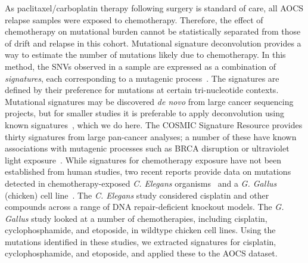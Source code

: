As paclitaxel/carboplatin therapy following surgery is standard of care, all AOCS relapse samples were exposed to chemotherapy. Therefore, the effect of chemotherapy on mutational burden cannot be statistically separated from those of drift and relapse in this cohort. Mutational signature deconvolution provides a way to estimate the number of mutations likely due to chemotherapy. In this method, the SNVs observed in a sample are expressed as a combination of \textit{signatures}, each corresponding to a mutagenic process~\cite{Alexandrov2013}. The signatures are defined by their preference for mutations at certain tri-nucleotide contexts. Mutational signatures may be discovered \textit{de novo} from large cancer sequencing projects, but for smaller studies it is preferable to apply deconvolution using known signatures~\cite{Rosenthal_2016}, which we do here. The COSMIC Signature Resource provides thirty signatures from large pan-cancer analyses; a number of these have known associations with mutagenic processes such as BRCA disruption or ultraviolet light exposure~\cite{364242}. While signatures for chemotherapy exposure have not been established from human studies, two recent reports provide data on mutations detected in chemotherapy-exposed \textit{C. Elegans} organisms~\cite{Meier_2014} and a \textit{G. Gallus} (chicken) cell line~\cite{Szikriszt_2016}. The \textit{C. Elegans} study considered cisplatin and other compounds across a range of DNA repair-deficient knockout models. The \textit{G. Gallus} study looked at a number of chemotherapies, including cisplatin, cyclophosphamide, and etoposide, in wildtype chicken cell lines. Using the mutations identified in these studies, we extracted signatures for cisplatin, cyclophosphamide, and etoposide, and applied these to the AOCS dataset.